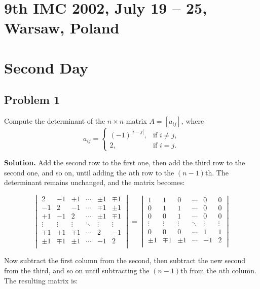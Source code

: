 \documentclass{article}
\begin{document}
\pagestyle{plain}

\section*{9th IMC 2002, July 19 -- 25, Warsaw, Poland}

\section*{Second Day}

\subsection*{Problem 1}
Compute the determinant of the $n \times n$ matrix $A = [a_{ij}]$, where
\[
a_{ij} =
    \begin{cases}
        (-1)^{|i-j|}, & \text{if } i \ne j, \\
        2, & \text{if } i = j.
    \end{cases}
\]

\textbf{Solution.}
Add the second row to the first one, then add the third row to the second one, and so on, until adding the $n$th row to the $(n-1)$th. The determinant remains unchanged, and the matrix becomes:

\[
\begin{vmatrix}
2 & -1 & +1 & \cdots & \pm 1 & \mp 1 \\
-1 & 2 & -1 & \cdots & \mp 1 & \pm 1 \\
+1 & -1 & 2 & \cdots & \pm 1 & \mp 1 \\
\vdots & \vdots & \vdots & \ddots & \vdots & \vdots \\
\mp 1 & \pm 1 & \mp 1 & \cdots & 2 & -1 \\
\pm 1 & \mp 1 & \pm 1 & \cdots & -1 & 2 \\
\end{vmatrix}
=
\begin{vmatrix}
1 & 1 & 0 & \cdots & 0 & 0 \\
0 & 1 & 1 & \cdots & 0 & 0 \\
0 & 0 & 1 & \cdots & 0 & 0 \\
\vdots & \vdots & \vdots & \ddots & \vdots & \vdots \\
0 & 0 & 0 & \cdots & 1 & 1 \\
\pm 1 & \mp 1 & \pm 1 & \cdots & -1 & 2 \\
\end{vmatrix}
\]

Now subtract the first column from the second, then subtract the new second from the third, and so on until subtracting the $(n-1)$th from the $n$th column. The resulting matrix is:
\end{document}
